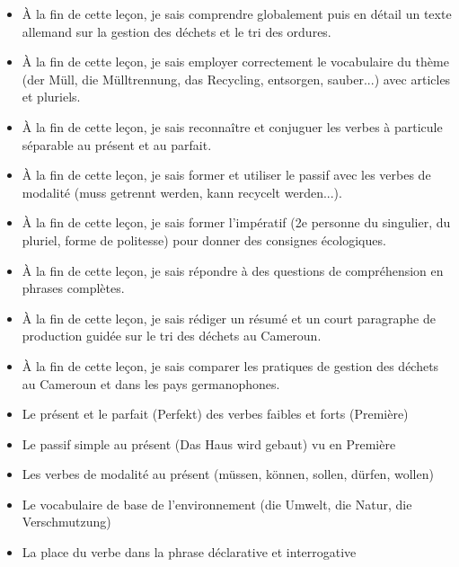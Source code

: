 \documentclass[11pt]{article}
\begin{document}
\begin{objectifs}
\begin{itemize}
\item À la fin de cette leçon, je sais comprendre globalement puis en détail un texte allemand sur la gestion des déchets et le tri des ordures.
\item À la fin de cette leçon, je sais employer correctement le vocabulaire du thème (der Müll, die Mülltrennung, das Recycling, entsorgen, sauber...) avec articles et pluriels.
\item À la fin de cette leçon, je sais reconnaître et conjuguer les verbes à particule séparable au présent et au parfait.
\item À la fin de cette leçon, je sais former et utiliser le passif avec les verbes de modalité (muss getrennt werden, kann recycelt werden...).
\item À la fin de cette leçon, je sais former l'impératif (2e personne du singulier, du pluriel, forme de politesse) pour donner des consignes écologiques.
\item À la fin de cette leçon, je sais répondre à des questions de compréhension en phrases complètes.
\item À la fin de cette leçon, je sais rédiger un résumé et un court paragraphe de production guidée sur le tri des déchets au Cameroun.
\item À la fin de cette leçon, je sais comparer les pratiques de gestion des déchets au Cameroun et dans les pays germanophones.
\end{itemize}
\end{objectifs}

\begin{prerequis}
\begin{itemize}
\item Le présent et le parfait (Perfekt) des verbes faibles et forts (Première)
\item Le passif simple au présent (Das Haus wird gebaut) vu en Première
\item Les verbes de modalité au présent (müssen, können, sollen, dürfen, wollen)
\item Le vocabulaire de base de l'environnement (die Umwelt, die Natur, die Verschmutzung)
\item La place du verbe dans la phrase déclarative et interrogative
\end{itemize}
\end{prerequis}

\newpage
\end{document}
